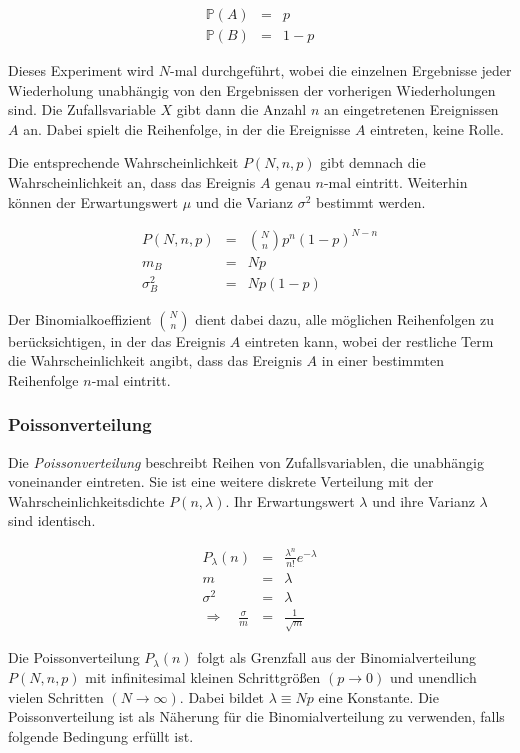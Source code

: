 \documentclass[12pt,a4paper]{scrartcl}
\numberwithin{equation}{section} %
\begin{document}
\begin{eqnarray}
	\mathbb P(A) &=& p \\
	\mathbb P(B) &=& 1 - p
\end{eqnarray}

\noindent
Dieses Experiment wird $N$-mal durchgeführt, wobei die einzelnen Ergebnisse jeder Wiederholung unabhängig von den Ergebnissen der vorherigen Wiederholungen sind. Die Zufallsvariable $X$ gibt dann die Anzahl $n$ an eingetretenen Ereignissen $A$ an. Dabei spielt die Reihenfolge, in der die Ereignisse $A$ eintreten, keine Rolle.

Die entsprechende  Wahrscheinlichkeit $P(N,n,p)$ gibt demnach die Wahrscheinlichkeit an, dass das Ereignis $A$ genau $n$-mal eintritt. Weiterhin können der Erwartungswert $\mu$ und die Varianz $\sigma^2$ bestimmt werden.

\begin{eqnarray}
	P(N,n,p) &=& \binom{N}{n} p^n (1-p)^{N-n} \\
	m_B &=& Np \\
	\sigma^2_B &=& N p (1-p)
\end{eqnarray}

\noindent
Der Binomialkoeffizient $\binom{N}{n}$ dient dabei dazu, alle möglichen Reihenfolgen zu berücksichtigen, in der das Ereignis $A$ eintreten kann, wobei der restliche Term die Wahrscheinlichkeit angibt, dass das Ereignis $A$ in einer bestimmten Reihenfolge $n$-mal eintritt.

\subsubsection{Poissonverteilung}
\label{Poissonverteilung}
Die \emph{Poissonverteilung} beschreibt Reihen von Zufallsvariablen, die unabhängig voneinander eintreten. Sie ist eine weitere diskrete Verteilung mit der Wahrscheinlichkeitsdichte $P(n,\lambda)$. Ihr Erwartungswert $\lambda$ und ihre Varianz $\lambda$ sind identisch.

\begin{eqnarray}
	P_\lambda(n) &=& \frac{\lambda^n}{n!} e^{-\lambda} \label{eq:poisson} \\
	m &=& \lambda\\
	\sigma^2 &=& \lambda \\
	\Rightarrow\quad \frac{\sigma}{m} &=&\frac{1}{\sqrt{m}} \label{eq:Poisson STD/EW}
\end{eqnarray}

\noindent
Die Poissonverteilung $P_\lambda(n)$ folgt als Grenzfall aus der Binomialverteilung $P(N, n, p)$ mit infinitesimal kleinen Schrittgrößen $(p\rightarrow 0)$ und unendlich vielen Schritten $(N\rightarrow \infty)$. Dabei bildet $\lambda\equiv Np$ eine Konstante. Die Poissonverteilung ist als Näherung für die Binomialverteilung zu verwenden, falls folgende Bedingung erfüllt ist.
\end{document}
